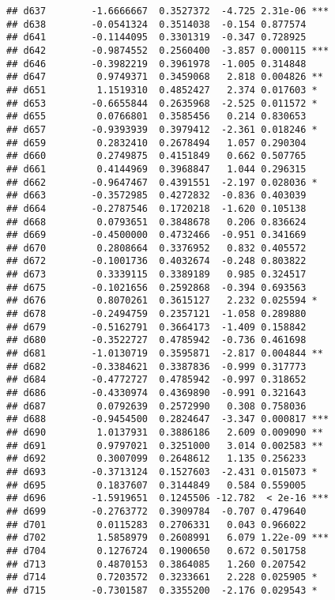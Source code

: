 \documentclass[
]{article}
\begin{document}
\begin{verbatim}
## d637        -1.6666667  0.3527372  -4.725 2.31e-06 ***
## d638        -0.0541324  0.3514038  -0.154 0.877574    
## d641        -0.1144095  0.3301319  -0.347 0.728925    
## d642        -0.9874552  0.2560400  -3.857 0.000115 ***
## d646        -0.3982219  0.3961978  -1.005 0.314848    
## d647         0.9749371  0.3459068   2.818 0.004826 ** 
## d651         1.1519310  0.4852427   2.374 0.017603 *  
## d653        -0.6655844  0.2635968  -2.525 0.011572 *  
## d655         0.0766801  0.3585456   0.214 0.830653    
## d657        -0.9393939  0.3979412  -2.361 0.018246 *  
## d659         0.2832410  0.2678494   1.057 0.290304    
## d660         0.2749875  0.4151849   0.662 0.507765    
## d661         0.4144969  0.3968847   1.044 0.296315    
## d662        -0.9647467  0.4391551  -2.197 0.028036 *  
## d663        -0.3572985  0.4272832  -0.836 0.403039    
## d664        -0.2787546  0.1720218  -1.620 0.105138    
## d668         0.0793651  0.3848678   0.206 0.836624    
## d669        -0.4500000  0.4732466  -0.951 0.341669    
## d670         0.2808664  0.3376952   0.832 0.405572    
## d672        -0.1001736  0.4032674  -0.248 0.803822    
## d673         0.3339115  0.3389189   0.985 0.324517    
## d675        -0.1021656  0.2592868  -0.394 0.693563    
## d676         0.8070261  0.3615127   2.232 0.025594 *  
## d678        -0.2494759  0.2357121  -1.058 0.289880    
## d679        -0.5162791  0.3664173  -1.409 0.158842    
## d680        -0.3522727  0.4785942  -0.736 0.461698    
## d681        -1.0130719  0.3595871  -2.817 0.004844 ** 
## d682        -0.3384621  0.3387836  -0.999 0.317773    
## d684        -0.4772727  0.4785942  -0.997 0.318652    
## d686        -0.4330974  0.4369890  -0.991 0.321643    
## d687         0.0792639  0.2572990   0.308 0.758036    
## d688        -0.9454500  0.2824647  -3.347 0.000817 ***
## d690         1.0137931  0.3886186   2.609 0.009090 ** 
## d691         0.9797021  0.3251000   3.014 0.002583 ** 
## d692         0.3007099  0.2648612   1.135 0.256233    
## d693        -0.3713124  0.1527603  -2.431 0.015073 *  
## d695         0.1837607  0.3144849   0.584 0.559005    
## d696        -1.5919651  0.1245506 -12.782  < 2e-16 ***
## d699        -0.2763772  0.3909784  -0.707 0.479640    
## d701         0.0115283  0.2706331   0.043 0.966022    
## d702         1.5858979  0.2608991   6.079 1.22e-09 ***
## d704         0.1276724  0.1900650   0.672 0.501758    
## d713         0.4870153  0.3864085   1.260 0.207542    
## d714         0.7203572  0.3233661   2.228 0.025905 *  
## d715        -0.7301587  0.3355200  -2.176 0.029543 *  

\end{verbatim}
\end{document}
